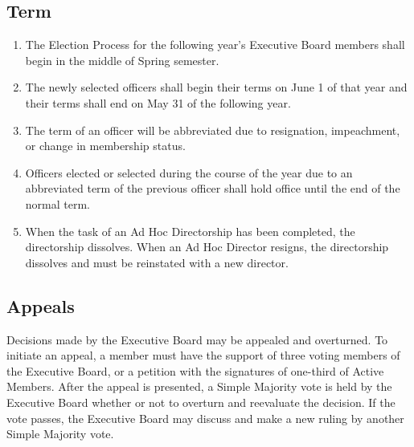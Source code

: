 \documentclass{article}
\newcommand{\asection}[1]{\subsection{#1} \label{#1}}
\begin{document}
\asection{Term}
\begin{enumerate}
\item The Election Process for the following year's Executive Board members shall begin in the middle of Spring semester.
\item The newly selected officers shall begin their terms on June 1 of that year and their terms shall end on May 31 of the following year.
\item The term of an officer will be abbreviated due to resignation, impeachment, or change in membership status.
\item Officers elected or selected during the course of the year due to an abbreviated term of the previous officer shall hold office until the end of the normal term.
\item When the task of an Ad Hoc Directorship has been completed, the directorship dissolves.
	When an Ad Hoc Director resigns, the directorship dissolves and must be reinstated with a new director.
\end{enumerate}

\asection{Appeals}
Decisions made by the Executive Board may be appealed and overturned.
To initiate an appeal, a member must have the support of three voting members of the Executive Board, or a petition with the signatures of one-third of Active Members.
After the appeal is presented, a Simple Majority vote is held by the Executive Board whether or not to overturn and reevaluate the decision.
If the vote passes, the Executive Board may discuss and make a new ruling by another Simple Majority vote.
\end{document}
